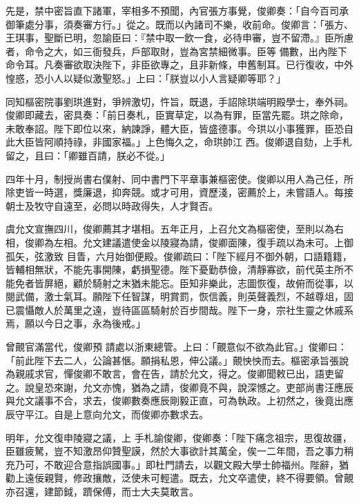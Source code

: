 \begin{pinyinscope}
 先是，禁中密旨直下諸軍，宰相多不預聞，內官張方事覺，俊卿奏：「自今百司承御筆處分事，須奏審方行。」從之。既而以內諸司不樂，收前命。俊卿言：「張方、王琪事，聖斷已明，忽諭臣曰：『禁中取一飲一食，必待申審，豈不留滯。』臣所慮者，命令之大，如三衙發兵，戶部取財，豈為宮禁細微事。臣等
 備數，出內陛下命令耳。凡奏審欲取決陛下，非臣欲專之，且非新條，申舊制耳。已行復收，中外惶惑，恐小人以疑似激聖怒。」上曰：「朕豈以小人言疑卿等耶？」



 同知樞密院事劉珙進對，爭辨激切，忤旨，既退，手詔除珙端明殿學士，奉外祠。俊卿即藏去，密具奏：「前日奏札，臣實草定，以為有罪，臣當先罷。珙之除命，未敢奉詔。陛下即位以來，納諫諍，體大臣，皆盛德事。今珙以小事獲罪，臣恐自此大臣皆阿順持祿，非國家福。」上色悔久之，命珙帥江
 西。俊卿退自劾，上手札留之，且曰：「卿雖百請，朕必不從。」



 四年十月，制授尚書右僕射、同中書門下平章事兼樞密使。俊卿以用人為己任，所除吏皆一時選，獎廉退，抑奔競。或才可用，資歷淺，密薦於上，未嘗語人。每接朝士及牧守自遠至，必問以時政得失，人才賢否。



 虞允文宣撫四川，俊卿薦其才堪相。五年正月，上召允文為樞密使，至則以為右相，俊卿為左相。允文建議遣使金以陵寢為請，俊卿面陳，復手疏以為未可。上御孤矢，弦激致
 目眚，六月始御便殿。俊卿疏曰：「陛下經月不御外朝，口語籍籍，皆輔相無狀，不能先事開陳，虧損聖德。陛下憂勤恭儉，清靜寡欲，前代英主所不能免者皆屏絕，顧於騎射之末猶未能忘。臣知非樂此，志圖恢復，故俯而從事，以閱武備，激士氣耳。願陛下任智謀，明賞罰，恢信義，則英聲義烈，不越尊俎，固已震懾敵人於萬里之遠，豈待區區騎射於百步間哉。陛下一身，宗社生靈之休戚系焉，願以今日之事，永為後戒。」



 曾覿官滿當代，俊卿預
 請處以浙東總管。上曰：「覿意似不欲為此官。」俊卿曰：「前此陛下去二人，公論甚愜。願捐私恩，伸公議。」覿怏怏而去。樞密承旨張說為親戚求官，憚俊卿不敢言，會在告，請於允文，得之。俊卿聞敕已出，語吏留之。說皇恐來謝，允文亦愧，猶為之請，俊卿竟不與，說深憾之。吏部尚書汪應辰與允文議事不合，求去，俊卿數奏應辰剛毅正直，可為執政。上初然之，後竟出應辰守平江。自是上意向允文，而俊卿亦數求去。



 明年，允文復申陵寢之議，上
 手札諭俊卿，俊卿奏：「陛下痛念祖宗，思復故疆，臣雖疲駑，豈不知激昂仰贊聖謨，然於大事欲計其萬全，俟一二年間，吾之事力稍充乃可，不敢迎合意指誤國事。」即杜門請去，以觀文殿大學士帥福州。陛辭，猶勸上遠佞親賢，修政攘敵，泛使未可輕遣。既去，允文卒遣使，終不得要領。曾覿亦召還，建節鉞，躋保傅，而士大夫莫敢言。




\end{pinyinscope}
